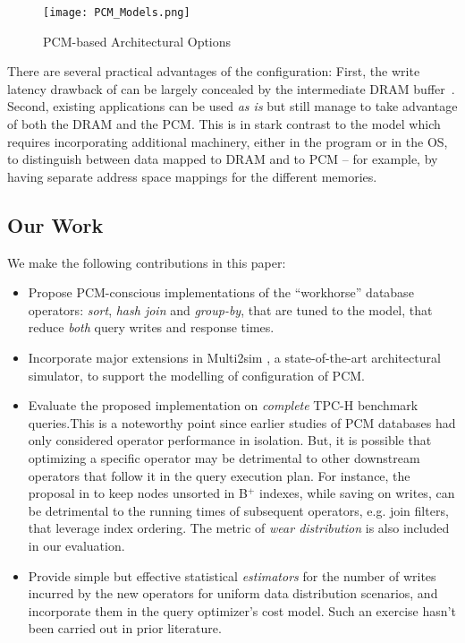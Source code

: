 \begin{figure}[t]
	\texttt{[image: PCM\_Models.png]}\centering
	\caption{PCM-based Architectural Options}
	\label{fig:pcm_models}
\end{figure}

There are several practical advantages of the \model{} configuration:
First, the write latency drawback of \modelPcmRam{} can be largely
concealed by the intermediate DRAM buffer~\cite{qureshi}. Second,
existing applications can be used \textit{as is} but still manage to take
advantage of both the DRAM and the PCM. This is in stark contrast to the
\modelExplicit{} model which requires incorporating additional machinery,
either in the program or in the OS, to distinguish between data mapped
to DRAM and to PCM -- for example, by having separate address space
mappings for the different memories.

\subsection*{Our Work}
We make the following contributions in this paper:
\begin{itemize}
\item Propose PCM-conscious implementations of the ``workhorse'' database operators:
\textit{sort}, \textit{hash join} and \textit{group-by}, that are tuned to the \model{} model, that reduce
\emph{both} query writes and response times.

\item Incorporate major extensions in Multi2sim \cite{multi2sim},
a state-of-the-art architectural simulator, to support the modelling of \model{} configuration of PCM.  



\item Evaluate the proposed implementation on \emph{complete} TPC-H benchmark queries.This is a noteworthy point since earlier studies of PCM databases had only
considered operator performance in isolation.  But, it is possible that
optimizing a specific operator may be detrimental to other downstream
operators that follow it in the query execution plan. For instance,
the proposal in \cite{chen} to keep nodes unsorted in B$^+$ indexes,
while saving on writes, can be detrimental to the running times of
subsequent operators, e.g. join filters, that leverage index ordering. The metric of \emph{wear  distribution} is also included in our evaluation.


\item Provide simple but effective statistical \emph{estimators} for the
number of writes incurred by the new operators for uniform data distribution scenarios, and incorporate them in the query optimizer's
cost model. Such an exercise hasn't been carried out in prior literature.

\end{itemize}

